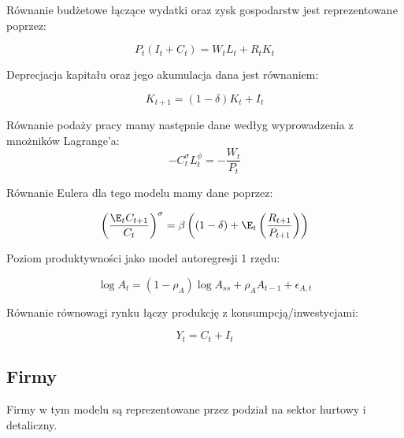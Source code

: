 Równanie budżetowe łączące wydatki oraz zysk gospodarstw jest reprezentowane poprzez:

\begin{equation}
    P_t(I_t + C_t) = W_t L_t + R_t K_t
\end{equation}

Deprecjacja kapitału oraz jego akumulacja dana jest równaniem:

\begin{equation}
    K_{t+1} = (1-\delta)K_t + I_t
\end{equation}

Równanie podaży pracy mamy następnie dane wedłyg wyprowadzenia z mnożników Lagrange'a:
\begin{equation}
    -C_t^\sigma L_t^\phi = -\frac{W_t}{P_t}
\end{equation}

Równanie Eulera dla tego modelu mamy dane poprzez:

\begin{equation}
    \left( \frac{\E_t C_{t+1}}{C_t}\right)^\sigma = \beta \left( (1-\delta) + \E_t \left( \frac{R_{t+1}}{P_{t+1}} \right) \right)
\end{equation}

Poziom produktywności jako model autoregresji 1 rzędu:

\begin{equation}
    \log A_t = (1 - \rho_A)\log A_{ss} + \rho_A A_{t-1} + \epsilon_{A,t}
\end{equation}

Równanie równowagi rynku łączy produkcję z konsumpcją/inwestycjami:

\begin{equation}
    Y_t = C_t + I_t
\end{equation}

\subsection{Firmy}

Firmy w tym modelu są reprezentowane przez podział na sektor hurtowy i detaliczny.



